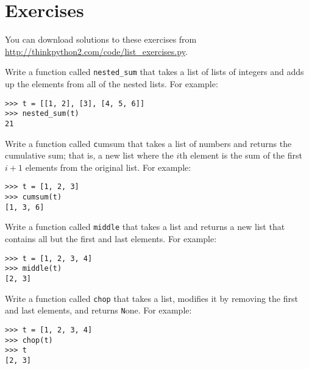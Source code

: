 \documentclass[
DIV=11,
fontsize=12,
twoside,
headinclude=false,
titlepage=firstiscover,
abstract=true,
headsepline=true,
footsepline=true,
chapterprefix=true, %
headings=big,
bibliography=totoc,%
captions=tableheading
]{scrbook}
\theoremstyle{definition}
\begin{document}
\section{Exercises}

You can download solutions to these exercises from
\url{http://thinkpython2.com/code/list_exercises.py}.

\begin{exercise}
\normalfont

Write a function called \verb"nested_sum" that takes a list of lists
of integers and adds up the elements from all of the nested lists.
For example:

\begin{lstlisting}
>>> t = [[1, 2], [3], [4, 5, 6]]
>>> nested_sum(t)
21
\end{lstlisting}

\end{exercise}

\begin{exercise}
\normalfont
\label{cumulative}

Write a function called {\texttt cumsum} that takes a list of numbers and
returns the cumulative sum; that is, a new list where the $i$th
element is the sum of the first $i+1$ elements from the original list.
For example:

\begin{lstlisting}
>>> t = [1, 2, 3]
>>> cumsum(t)
[1, 3, 6]
\end{lstlisting}

\end{exercise}

\begin{exercise}
\normalfont

Write a function called \verb"middle" that takes a list and
returns a new list that contains all but the first and last
elements.  For example:

\begin{lstlisting}
>>> t = [1, 2, 3, 4]
>>> middle(t)
[2, 3]
\end{lstlisting}

\end{exercise}

\begin{exercise}
\normalfont

Write a function called \verb"chop" that takes a list, modifies it
by removing the first and last elements, and returns {\texttt None}.
For example:

\begin{lstlisting}
>>> t = [1, 2, 3, 4]
>>> chop(t)
>>> t
[2, 3]
\end{lstlisting}

\end{exercise}
\end{document}
